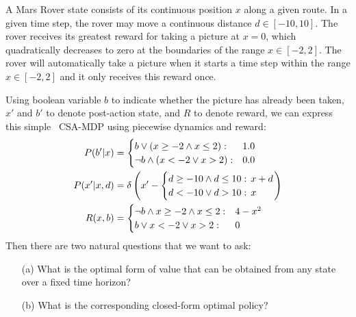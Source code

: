 \begin{example*}[\MarsRover]
\label{ex:knapsack}
A Mars Rover state consists of its continuous position $x$ along a
given route.  In a given time step, the rover may move a 
continuous distance $d \in [-10,10]$.  The rover receives its greatest
reward for taking a picture at $x=0$, which quadratically decreases
to zero at the boundaries of the range $x \in [-2,2]$.  The rover will
automatically take a picture when it starts a time step within the
range $x \in [-2,2]$ and it only receives this reward once.
\end{example*}
Using boolean variable $b$ to indicate whether the picture has
already been taken, $x'$ and $b'$ to denote 
post-action state, and $R$ to denote reward, we can
express this simple \MarsRover\ CSA-MDP using piecewise dynamics and reward:
\begin{align} 
P(b'|x) & = 
\begin{cases}
b \lor (x \geq -2 \land x \leq 2): & 1.0\\
\neg b \land (x < -2 \lor x > 2):  & 0.0
\end{cases} \label{eq:mr_discrete_trans} \\
P(x'|x,d) & = \delta \left( x' - \begin{cases}
d \geq -10 \land d \leq 10 : & \hspace{-2mm} x + d \\
d < -10 \lor d > 10 : & \hspace{-2mm} x
\end{cases}
\right) \label{eq:mr_cont_trans} \\
R(x,b) & = \begin{cases}
\neg b \land x \geq -2 \land x \leq 2 : & 4 - x^2 \\
b \lor x < -2 \lor x > 2 : & 0
\end{cases} \label{eq:mr_reward}
\end{align}
Then there are two natural questions that we want to ask:
\begin{enumerate}
\item[(a)] What is the optimal form of value that can be 
obtained from any state over a fixed time horizon?
\item[(b)] What is the corresponding closed-form optimal policy?
\end{enumerate}

